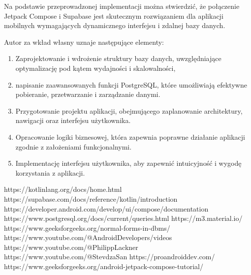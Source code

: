 \documentclass[12pt,twoside]{article}
\begin{document}
Na podstawie przeprowadzonej implementacji można stwierdzić, że połączenie Jetpack Compose i Supabase jest 
skutecznym rozwiązaniem dla aplikacji mobilnych wymagających dynamicznego interfejsu i zdalnej bazy danych.

Autor za wkład własny uznaje następujące elementy:
\begin{enumerate}[label=\alph*), leftmargin=1.25cm]
	\item Zaprojektowanie i wdrożenie struktury bazy danych, uwzględniające 
	optymalizację pod kątem wydajności i skalowalności,
	\item napisanie zaawansowanych funkcji PostgreSQL, które umożliwiają efektywne pobieranie, przetwarzanie i 
	zarządzanie danymi.
	\item Przygotowanie projektu aplikacji, obejmującego zaplanowanie architektury, nawigacji oraz interfejsu 
	użytkownika.
	\item Opracowanie logiki biznesowej, która zapewnia poprawne działanie aplikacji zgodnie z założeniami 
	funkcjonalnymi.
	\item Implementację interfejsu użytkownika, aby zapewnić intuicyjność i wygodę korzystania z aplikacji.
\end{enumerate}

\clearpage


\begin{thebibliography}{4}
	\bibitem{} https://kotlinlang.org/docs/home.html
	\bibitem{} https://supabase.com/docs/reference/kotlin/introduction
	\bibitem{} https://developer.android.com/develop/ui/compose/documentation
	\bibitem{} https://www.postgresql.org/docs/current/queries.html
	\bibitem{} https://m3.material.io/
	\bibitem{} https://www.geeksforgeeks.org/normal-forms-in-dbms/
	\bibitem{} https://www.youtube.com/@AndroidDevelopers/videos
	\bibitem{} https://www.youtube.com/@PhilippLackner
	\bibitem{} https://www.youtube.com/@StevdzaSan
	\bibitem{} https://proandroiddev.com/
	\bibitem{} https://www.geeksforgeeks.org/android-jetpack-compose-tutorial/
\end{thebibliography}

\clearpage

\makesummary
\end{document}
